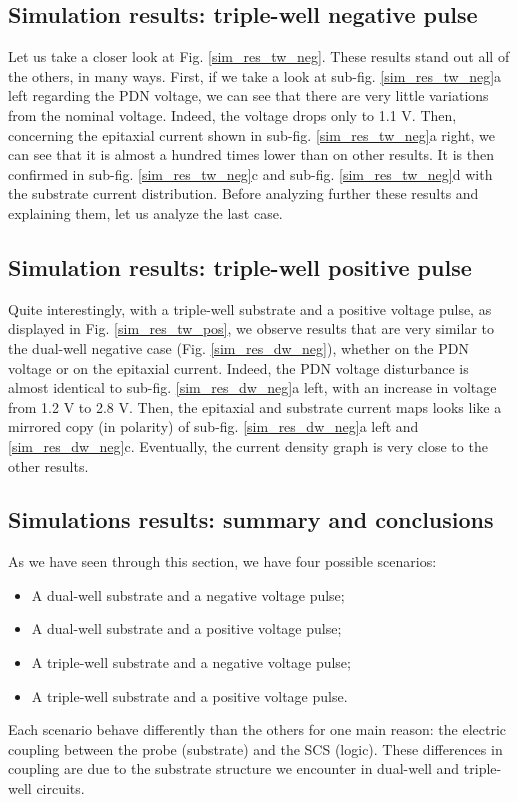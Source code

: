 	\subsection{Simulation results: triple-well negative pulse}
		Let us take a closer look at Fig. \ref{sim_res_tw_neg}.
		These results stand out all of the others, in many ways.
		First, if we take a look at sub-fig. \ref{sim_res_tw_neg}a left regarding the PDN voltage, we can see that there are very little variations from the nominal voltage.
		Indeed, the voltage drops only to 1.1 V.
		Then, concerning the epitaxial current shown in sub-fig. \ref{sim_res_tw_neg}a right, we can see that it is almost a hundred times lower than on other results.
		It is then confirmed in sub-fig. \ref{sim_res_tw_neg}c and sub-fig. \ref{sim_res_tw_neg}d with the substrate current distribution.
		Before analyzing further these results and explaining them, let us analyze the last case.

	\subsection{Simulation results: triple-well positive pulse}
		Quite interestingly, with a triple-well substrate and a positive voltage pulse, as displayed in Fig. \ref{sim_res_tw_pos}, we observe results that are very similar to the dual-well negative case (Fig. \ref{sim_res_dw_neg}), whether on the PDN voltage or on the epitaxial current.
		Indeed, the PDN voltage disturbance is almost identical to sub-fig. \ref{sim_res_dw_neg}a left, with an increase in voltage from 1.2 V to 2.8 V.
		Then, the epitaxial and substrate current maps looks like a mirrored copy (in polarity) of sub-fig. \ref{sim_res_dw_neg}a left and \ref{sim_res_dw_neg}c.
		Eventually, the current density graph is very close to the other results.

	\subsection{Simulations results: summary and conclusions}
		As we have seen through this section, we have four possible scenarios:
		\begin{itemize}
			\item A dual-well substrate and a negative voltage pulse;
			\item A dual-well substrate and a positive voltage pulse;
			\item A triple-well substrate and a negative voltage pulse;
			\item A triple-well substrate and a positive voltage pulse.
		\end{itemize}
		Each scenario behave differently than the others for one main reason: the electric coupling between the probe (substrate) and the SCS (logic).
		These differences in coupling are due to the substrate structure we encounter in dual-well and triple-well circuits.

